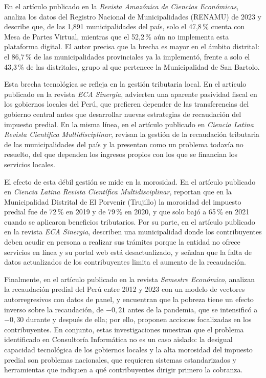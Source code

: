 \documentclass[12pt,a4paper]{report}
\begin{document}
En el artículo publicado en la \textit{Revista Amazónica de Ciencias Económicas}, \textcite{francoulco2026} analiza los datos del Registro Nacional de Municipalidades (RENAMU) de 2023 y describe que, de las 1,891 municipalidades del país, solo el 47,8\,\% cuenta con Mesa de Partes Virtual, mientras que el 52,2\,\% aún no implementa esta plataforma digital. El autor precisa que la brecha es mayor en el ámbito distrital: el 86,7\,\% de las municipalidades provinciales ya la implementó, frente a solo el 43,3\,\% de las distritales, grupo al que pertenece la Municipalidad de San Bartolo.

Esta brecha tecnológica se refleja en la gestión tributaria local. En el artículo publicado en la revista \textit{ECA Sinergia}, \textcite{romerocarazas2021} advierten una aparente pasividad fiscal en los gobiernos locales del Perú, que prefieren depender de las transferencias del gobierno central antes que desarrollar nuevas estrategias de recaudación del impuesto predial. En la misma línea, en el artículo publicado en \textit{Ciencia Latina Revista Científica Multidisciplinar}, \textcite{rojasbarbaran2021} revisan la gestión de la recaudación tributaria de las municipalidades del país y la presentan como un problema todavía no resuelto, del que dependen los ingresos propios con los que se financian los servicios locales.

El efecto de esta débil gestión se mide en la morosidad. En el artículo publicado en \textit{Ciencia Latina Revista Científica Multidisciplinar}, \textcite{riosvelasquez2022} reportan que en la Municipalidad Distrital de El Porvenir (Trujillo) la morosidad del impuesto predial fue de 72\,\% en 2019 y de 79\,\% en 2020, y que solo bajó a 65\,\% en 2021 cuando se aplicaron beneficios tributarios. Por su parte, en el artículo publicado en la revista \textit{ECA Sinergia}, \textcite{soriadiaz2022} describen una municipalidad donde los contribuyentes deben acudir en persona a realizar sus trámites porque la entidad no ofrece servicios en línea y su portal web está desactualizado, y señalan que la falta de datos actualizados de los contribuyentes limita el aumento de la recaudación.

Finalmente, en el artículo publicado en la revista \textit{Semestre Económico}, \textcite{cayatopa2026} analizan la recaudación predial del Perú entre 2012 y 2023 con un modelo de vectores autorregresivos con datos de panel, y encuentran que la pobreza tiene un efecto inverso sobre la recaudación, de $-0{,}21$ antes de la pandemia, que se intensificó a $-0{,}30$ durante y después de ella; por ello, proponen acciones focalizadas en los contribuyentes. En conjunto, estas investigaciones muestran que el problema identificado en Consultoría Informática no es un caso aislado: la desigual capacidad tecnológica de los gobiernos locales y la alta morosidad del impuesto predial son problemas nacionales, que requieren sistemas estandarizados y herramientas que indiquen a qué contribuyentes dirigir primero la cobranza.
\end{document}
